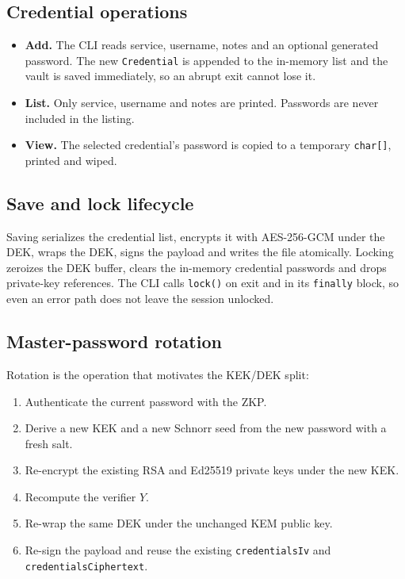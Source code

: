 \documentclass[11pt,a4paper]{article}
\newcommand{\code}[1]{\texttt{#1}}
\begin{document}
\subsection{Credential operations}

\begin{itemize}[leftmargin=*]
  \item \textbf{Add.} The CLI reads service, username, notes and an optional
        generated password. The new \code{Credential} is appended to the
        in-memory list and the vault is saved immediately, so an abrupt exit
        cannot lose it.
  \item \textbf{List.} Only service, username and notes are printed. Passwords
        are never included in the listing.
  \item \textbf{View.} The selected credential's password is copied to a
        temporary \code{char[]}, printed and wiped.
\end{itemize}

\subsection{Save and lock lifecycle}

Saving serializes the credential list, encrypts it with AES-256-GCM under the
DEK, wraps the DEK, signs the payload and writes the file atomically. Locking
zeroizes the DEK buffer, clears the in-memory credential passwords and drops
private-key references. The CLI calls \code{lock()} on exit and in its
\code{finally} block, so even an error path does not leave the session unlocked.

\subsection{Master-password rotation}

Rotation is the operation that motivates the KEK/DEK split:

\begin{enumerate}[leftmargin=*]
  \item Authenticate the current password with the ZKP.
  \item Derive a new KEK and a new Schnorr seed from the new password with a
        fresh salt.
  \item Re-encrypt the existing RSA and Ed25519 private keys under the new KEK.
  \item Recompute the verifier $Y$.
  \item Re-wrap the same DEK under the unchanged KEM public key.
  \item Re-sign the payload and reuse the existing \code{credentialsIv} and
        \code{credentialsCiphertext}.
\end{enumerate}
\end{document}
